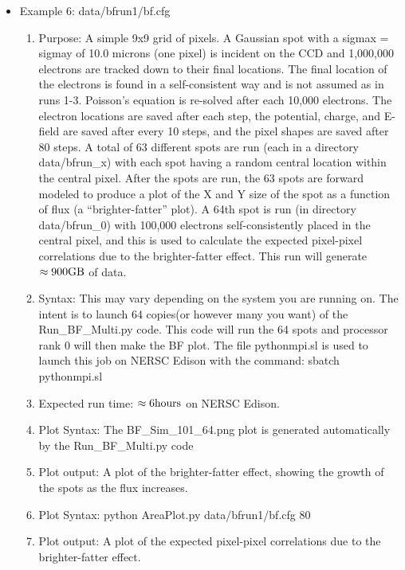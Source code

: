 \documentclass{article} %
\begin{document}
\begin{itemize}
      \item Example 6: data/bfrun1/bf.cfg
    \begin{enumerate}
      \item Purpose: A simple 9x9 grid of pixels.  A Gaussian spot with a sigmax = sigmay of 10.0 microns (one pixel) is incident on the CCD and 1,000,000 electrons are tracked down to their final locations. The final location of the electrons is found in a self-consistent way and is not assumed as in runs 1-3.  Poisson's equation is re-solved after each 10,000 electrons.  The electron locations are saved after each step, the potential, charge, and E-field are saved after every 10 steps, and the pixel shapes are saved after 80 steps. A total of 63 different spots are run (each in a directory data/bfrun\_x) with each spot having a random central location within the central pixel.  After the spots are run, the 63 spots are forward modeled to produce a plot of the X and Y size of the spot as a function of flux (a ``brighter-fatter'' plot). A 64th spot is run (in directory data/bfrun\_0) with 100,000 electrons self-consistently placed in the central pixel, and this is used to calculate the expected pixel-pixel correlations due to the brighter-fatter effect.  This run will generate $\rm \approx 900 GB$ of data.
      \item Syntax: This may vary depending on the system you are running on.  The intent is to launch 64 copies(or however many you want) of the Run\_BF\_Multi.py code.  This code will run the 64 spots and processor rank 0 will then make the BF plot.  The file pythonmpi.sl is used to launch this job on NERSC Edison with the command:  sbatch pythonmpi.sl 
      \item Expected run time: $\rm \approx 6 hours$ on NERSC Edison.
      \item Plot Syntax: The BF\_Sim\_101\_64.png plot is generated automatically by the Run\_BF\_Multi.py code
      \item Plot output: A plot of the brighter-fatter effect, showing the growth of the spots as the flux increases.
      \item Plot Syntax: python AreaPlot.py data/bfrun1/bf.cfg 80
      \item Plot output: A plot of the expected pixel-pixel correlations due to the brighter-fatter effect.
    \end{enumerate}



    
\end{itemize}
\end{document}

